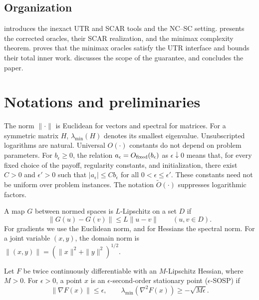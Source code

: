\documentclass{article}
\begin{document}
\subsection{Organization}

 introduces the inexact UTR and SCAR
tools and the NC--SC setting. 
presents the corrected oracles, their SCAR realization, and the
minimax complexity theorem.  proves that
the minimax oracles satisfy the UTR interface and bounds their total
inner work.  discusses the scope of
the guarantee, and  concludes the paper.

\section{Notations and preliminaries}
\label{sec:preliminaries}

The norm $\|\cdot\|$ is Euclidean for vectors and spectral for matrices.
For a symmetric matrix $H$, $\lambda_{\min}(H)$ denotes its smallest
eigenvalue.  Unsubscripted logarithms are natural.
Universal $O(\cdot)$ constants do not depend on problem parameters.
For $b_\epsilon\ge0$, the relation
$a_\epsilon=O_{\rm fixed}(b_\epsilon)$ as $\epsilon\downarrow0$
means that, for every fixed choice of the payoff, regularity
constants, and initialization, there exist $C>0$ and $\epsilon'>0$
such that $|a_\epsilon|\le Cb_\epsilon$ for all
$0<\epsilon\le\epsilon'$.  These constants need not be uniform over
problem instances.  The notation $\widetilde O(\cdot)$ suppresses
logarithmic factors.

\begin{definition}\label{def:lipschitz}
A map $G$ between normed spaces is $L$-Lipschitz on a set $D$ if
\[
 \|G(u)-G(v)\|\le L\|u-v\|\qquad(u,v\in D).
\]
For gradients we use the Euclidean norm, and for Hessians the
spectral norm.  For a joint variable $(x,y)$, the domain norm is
$\|(x,y)\|=(\|x\|^2+\|y\|^2)^{1/2}$.
\end{definition}

\begin{definition}
\label{def:stationarity}
Let $F$ be twice continuously differentiable with an $M$-Lipschitz
Hessian, where $M>0$.  For $\epsilon>0$, a point $x$ is an
$\epsilon$-second-order stationary point ($\epsilon$-SOSP) if
\[
 \|\nabla F(x)\|\le\epsilon,\qquad
 \lambda_{\min}(\nabla^2F(x))\ge-\sqrt{M\epsilon}.
\]
\end{definition}
\end{document}

